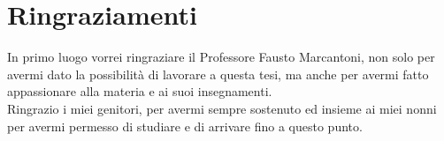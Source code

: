 \chapter*{Ringraziamenti}

In primo luogo vorrei ringraziare il Professore Fausto Marcantoni, non solo per avermi dato la possibilità di lavorare a questa tesi, ma anche per avermi fatto appassionare alla materia e ai suoi insegnamenti. \\
Ringrazio i miei genitori, per avermi sempre sostenuto ed insieme ai miei nonni per avermi permesso di studiare e di arrivare fino a questo punto. \\
